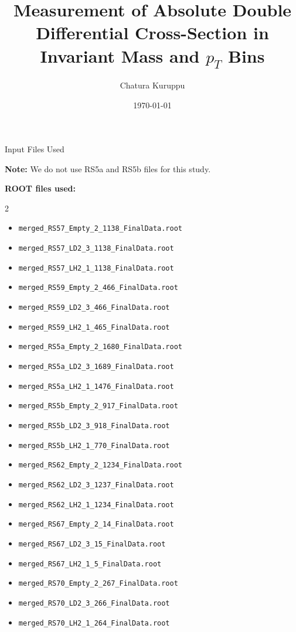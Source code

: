 \documentclass[aspectratio=169]{beamer}
\title{Measurement of Absolute Double Differential Cross-Section in Invariant Mass and $p_T$ Bins}
\author{Chatura Kuruppu}
\institute{SeaQuest Experiment (E906) \\ Fermi National Accelerator Laboratory}
\date{\today}
\begin{document}
\begin{frame}
    \titlepage
\end{frame}

\begin{frame}{Input Files Used}
    
\textbf{Note:} We do not use RS5a and RS5b files for this study.

\vspace{0.2cm}
\textbf{ROOT files used:}
\begin{multicols}{2}
\begin{itemize}
    \tiny
    \item \texttt{merged\_RS57\_Empty\_2\_1138\_FinalData.root}
    \item \texttt{merged\_RS57\_LD2\_3\_1138\_FinalData.root}
    \item \texttt{merged\_RS57\_LH2\_1\_1138\_FinalData.root}
    \item \texttt{merged\_RS59\_Empty\_2\_466\_FinalData.root}
    \item \texttt{merged\_RS59\_LD2\_3\_466\_FinalData.root}
    \item \texttt{merged\_RS59\_LH2\_1\_465\_FinalData.root}
    \item \texttt{merged\_RS5a\_Empty\_2\_1680\_FinalData.root}
    \item \texttt{merged\_RS5a\_LD2\_3\_1689\_FinalData.root}
    \item \texttt{merged\_RS5a\_LH2\_1\_1476\_FinalData.root}
    \item \texttt{merged\_RS5b\_Empty\_2\_917\_FinalData.root}
    \item \texttt{merged\_RS5b\_LD2\_3\_918\_FinalData.root}
    \item \texttt{merged\_RS5b\_LH2\_1\_770\_FinalData.root}
    \item \texttt{merged\_RS62\_Empty\_2\_1234\_FinalData.root}
    \item \texttt{merged\_RS62\_LD2\_3\_1237\_FinalData.root}
    \item \texttt{merged\_RS62\_LH2\_1\_1234\_FinalData.root}
    \item \texttt{merged\_RS67\_Empty\_2\_14\_FinalData.root}
    \item \texttt{merged\_RS67\_LD2\_3\_15\_FinalData.root}
    \item \texttt{merged\_RS67\_LH2\_1\_5\_FinalData.root}
    \item \texttt{merged\_RS70\_Empty\_2\_267\_FinalData.root}
    \item \texttt{merged\_RS70\_LD2\_3\_266\_FinalData.root}
    \item \texttt{merged\_RS70\_LH2\_1\_264\_FinalData.root}
\end{itemize}
\end{multicols}

\end{frame}
\end{document}

